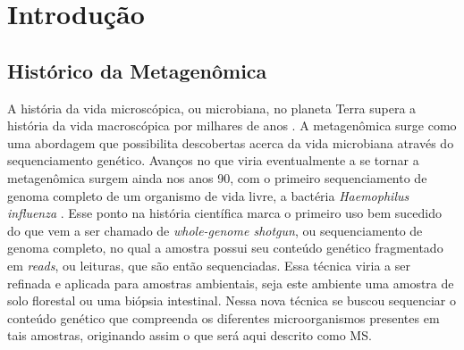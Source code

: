\documentclass[
	12pt,				%
	oneside,			%
	a4paper,			%
	chapter=TITLE,		%
	section=TITLE,		%
	english,			%
	brazil				%
	]{abntex2}
\begin{document}
{%
	\hypersetup{hidelinks}
	\listoffigures*
	\cleardoublepage



	\imprimirlistadesiglas


	\tableofcontents*
	\cleardoublepage

}%


\textual

\chapter{Introdução}\label{intro}

\section{Histórico da Metagenômica}\label{histuxf3rico-da-metagenuxf4mica}

A história da vida microscópica, ou microbiana, no planeta Terra supera a história da vida macroscópica por milhares de anos \autocite{magnabosco2024}. A metagenômica surge como uma abordagem que possibilita descobertas acerca da vida microbiana através do sequenciamento genético. Avanços no que viria eventualmente a se tornar a metagenômica surgem ainda nos anos 90, com o primeiro sequenciamento de genoma completo de um organismo de vida livre, a bactéria \emph{Haemophilus influenza} \autocite{wooley2010}. Esse ponto na história científica marca o primeiro uso bem sucedido do que vem a ser chamado de \emph{whole-genome shotgun}, ou sequenciamento de genoma completo, no qual a amostra possui seu conteúdo genético fragmentado em \emph{reads}, ou leituras, que são então sequenciadas. Essa técnica viria a ser refinada e aplicada para amostras ambientais, seja este ambiente uma amostra de solo florestal ou uma biópsia intestinal. Nessa nova técnica se buscou sequenciar o conteúdo genético que compreenda os diferentes microorganismos presentes em tais amostras, originando assim o que será aqui descrito como \gls{MS}.
\end{document}

